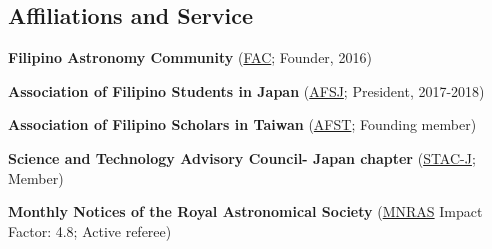 \documentclass[12pt,letterpaper]{article}
\begin{document}

\subsection{Affiliations and Service}
\begin{list}{}{\cvlist}
    \item \textbf{Filipino Astronomy Community} (\href{https://www.facebook.com/groups/filastrocomm}{FAC}; Founder, 2016)
    \item \textbf{Association of Filipino Students in Japan} (\href{https://www.facebook.com/afsjpage}{AFSJ}; President, 2017-2018)
    \item \textbf{Association of Filipino Scholars in Taiwan} (\href{https://www.facebook.com/AssocIskolar}{AFST}; Founding member)
    \item \textbf{Science and Technology Advisory Council- Japan chapter} (\href{https://www.facebook.com/profile.php?id=100083271798519}{STAC-J}; Member)
    \item \textbf{Monthly Notices of the Royal Astronomical Society} (\href{https://academic.oup.com/mnras}{MNRAS} Impact Factor: 4.8; Active referee)
\end{list}
\end{document}
